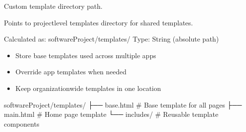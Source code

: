 \documentclass[letterpaper,10pt,english]{sphinxmanual}
\begin{document}
\begin{fulllineitems}
\label{\detokenize{softwareProject:softwareProject.settings.TEMP_DIR}}
\pysigstartsignatures
\pysigline
{}
\pysigstopsignatures
\sphinxAtStartPar
Custom template directory path.

\sphinxAtStartPar
Points to project\sphinxhyphen{}level templates directory for shared templates.

\sphinxAtStartPar
Calculated as: softwareProject/templates/
Type: String (absolute path)
\begin{description}
\begin{itemize}
\item {} 
\sphinxAtStartPar
Store base templates used across multiple apps

\item {} 
\sphinxAtStartPar
Override app templates when needed

\item {} 
\sphinxAtStartPar
Keep organization\sphinxhyphen{}wide templates in one location

\end{itemize}

\sphinxAtStartPar
softwareProject/templates/
├── base.html          \# Base template for all pages
├── main.html          \# Home page template
└── includes/          \# Reusable template components

\end{description}

\end{fulllineitems}

\end{document}
